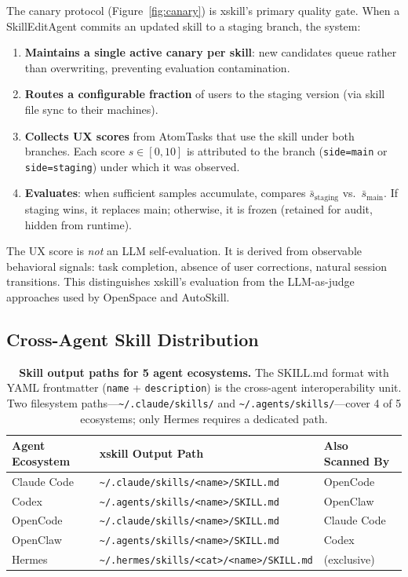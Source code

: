 \documentclass[11pt]{article}
\begin{document}
The canary protocol (Figure~\ref{fig:canary}) is xskill's primary quality gate. When a SkillEditAgent commits an updated skill to a staging branch, the system:

\begin{enumerate}
    \item \textbf{Maintains a single active canary per skill}: new candidates queue rather than overwriting, preventing evaluation contamination.
    \item \textbf{Routes a configurable fraction} of users to the staging version (via skill file sync to their machines).
    \item \textbf{Collects UX scores} from AtomTasks that use the skill under both branches. Each score $s \in [0, 10]$ is attributed to the branch (\texttt{side=main} or \texttt{side=staging}) under which it was observed.
    \item \textbf{Evaluates}: when sufficient samples accumulate, compares $\bar{s}_{\text{staging}}$ vs.\ $\bar{s}_{\text{main}}$. If staging wins, it replaces main; otherwise, it is frozen (retained for audit, hidden from runtime).
\end{enumerate}

The UX score is \emph{not} an LLM self-evaluation. It is derived from observable behavioral signals: task completion, absence of user corrections, natural session transitions. This distinguishes xskill's evaluation from the LLM-as-judge approaches used by OpenSpace and AutoSkill.

\subsection{Cross-Agent Skill Distribution}
\label{sec:distribution}

\begin{table}[t]
\centering
\caption{\textbf{Skill output paths for 5 agent ecosystems.} The SKILL.md format with YAML frontmatter (\texttt{name} + \texttt{description}) is the cross-agent interoperability unit. Two filesystem paths---\texttt{\~{}/.claude/skills/} and \texttt{\~{}/.agents/skills/}---cover 4 of 5 ecosystems; only Hermes requires a dedicated path.}
\label{tab:distribution}
\small
\begin{tabular}{@{}lll@{}}
\toprule
\textbf{Agent Ecosystem} & \textbf{xskill Output Path} & \textbf{Also Scanned By} \\
\midrule
Claude Code & \texttt{\~{}/.claude/skills/<name>/SKILL.md} & OpenCode \\
Codex       & \texttt{\~{}/.agents/skills/<name>/SKILL.md} & OpenClaw \\
OpenCode    & \texttt{\~{}/.claude/skills/<name>/SKILL.md} & Claude Code \\
OpenClaw    & \texttt{\~{}/.agents/skills/<name>/SKILL.md} & Codex \\
Hermes      & \texttt{\~{}/.hermes/skills/<cat>/<name>/SKILL.md} & (exclusive) \\
\bottomrule
\end{tabular}
\end{table}
\end{document}
